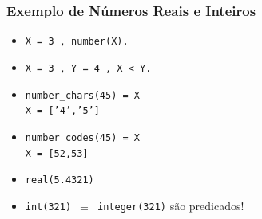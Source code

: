 \documentclass[10pt]{beamer}
\begin{document}
\begin{frame}
    \frametitle{Exemplo de Números Reais e Inteiros}
   
  \begin{itemize}
    \item  \texttt{X = 3 , number(X).}
    \item  \texttt{X = 3 , Y = 4 , X < Y.}
    \item \texttt{number\_chars(45) = X}\\ 
    \pause
    \texttt{X = ['4','5']}

    \item \texttt{number\_codes(45) = X}\\
    \pause
    \texttt{X = [52,53]}
    
    \item \texttt{real(5.4321)}
    
    \item \texttt{int(321) $\equiv$ integer(321)} são predicados!
    
  \end{itemize}
  
   
\end{frame}


\end{document}

